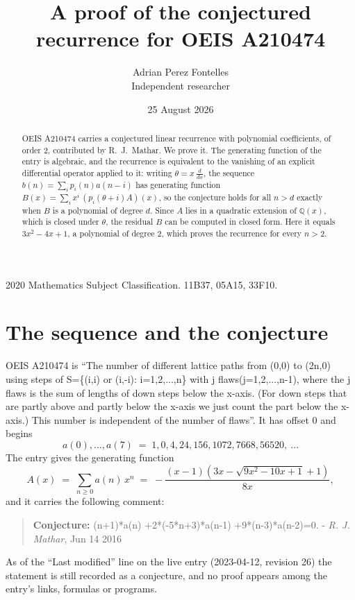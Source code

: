 \documentclass[11pt,a4paper]{article}
\title{A proof of the conjectured recurrence for OEIS A210474}
\author{Adrian Perez Fontelles\\ \small Independent researcher}
\date{25 August 2026}
\theoremstyle{plain}
\theoremstyle{definition}
\begin{document}
\maketitle

\begin{abstract}
OEIS A210474 carries a conjectured linear recurrence with polynomial coefficients, of
order 2, contributed by R.~J.~Mathar. We prove it. The generating function of the
entry is algebraic, and the recurrence is equivalent to the vanishing of an explicit
differential operator applied to it: writing $\theta=x\,\frac{d}{dx}$, the sequence
$b(n)=\sum_{i}p_{i}(n)a(n-i)$ has generating function
$B(x)=\sum_{i}x^{i}\,(p_{i}(\theta+i)A)(x)$, so the conjecture holds for all $n>d$ exactly
when $B$ is a polynomial of degree $d$. Since $A$ lies in a quadratic extension of
$\mathbb{Q}(x)$, which is closed under $\theta$, the residual $B$ can be computed in
closed form. Here it equals $3 x^{2} - 4 x + 1$, a polynomial of degree $2$, which proves
the recurrence for every $n>2$.
\end{abstract}

\noindent\small 2020 Mathematics Subject Classification. 11B37, 05A15, 33F10.\normalsize

\section{The sequence and the conjecture}

OEIS A210474 is ``The number of different lattice paths from (0,0) to (2n,0) using steps of S=\{(i,i) or (i,-i): i=1,2,...,n\} with j flaws(j=1,2,...,n-1), where the j flaws is the sum of lengths of down steps below the x-axis. (For down steps that are partly above and partly below the x-axis we just count the part below the x-axis.) This number is independent of the number of flaws''. It has offset $0$ and begins
\[
a(0),\dots,a(7)\;=\;1, 0, 4, 24, 156, 1072, 7668, 56520,\ \dots
\]
The entry gives the generating function
\begin{equation}\label{eq:gf}
A(x)\;=\;\sum_{n\ge 0} a(n)\,x^{n}\;=\;- \frac{\left(x - 1\right) \left(3 x - \sqrt{9 x^{2} - 10 x + 1} + 1\right)}{8 x} ,
\end{equation}
and it carries the following comment:
\begin{quote}\small
\textbf{Conjecture:}  (n+1)*a(n) +2*(-5*n+3)*a(n-1) +9*(n-3)*a(n-2)=0. - \emph{R. J. Mathar}, Jun 14 2016
\end{quote}
As of the ``Last modified'' line on the live entry (2023-04-12, revision 26) the
statement is still recorded as a conjecture, and no proof appears among the entry's links,
formulas or programs.
\end{document}
